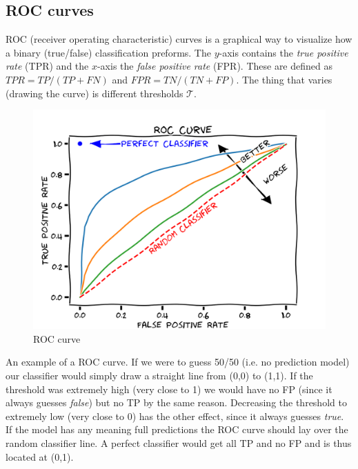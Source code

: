 \documentclass{article}
\begin{document}
\subsection{ROC curves}

ROC (receiver operating characteristic) curves is a graphical way to visualize how a binary (true/false) classification preforms. The $y$-axis contains the \textit{true positive rate} (TPR) and the $x$-axis the \textit{false positive rate} (FPR). These are defined as $TPR = TP/(TP+FN)$ and $FPR = TN/(TN+FP)$. The thing that varies (drawing the curve) is different thresholds $\mathcal{T}$.

\begin{minipage}{0.5\textwidth}
\begin{figure}[H]
\includegraphics[width=1.1\linewidth]{roc.png}
\caption{\label{fig:roc} ROC curve}
\end{figure}
\end{minipage} \hfill
\begin{minipage}{0.5\textwidth}
An example of a ROC curve. If we were to guess 50/50 (i.e. no prediction model) our classifier would simply draw a straight line from (0,0) to (1,1). If the threshold was extremely high (very close to 1) we would have no FP (since it always guesses \textit{false}) but no TP by the same reason. Decreasing the threshold to extremely low (very close to 0) has the other effect, since it always guesses \textit{true}. If the model has any meaning full predictions the ROC curve should lay over the random classifier line. A perfect classifier would get all TP and no FP and is thus located at (0,1). 
\end{minipage}
\end{document}
